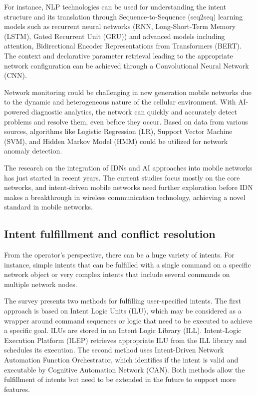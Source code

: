For instance, NLP technologies can be used for understanding the intent structure and its translation through Sequence-to-Sequence (seq2seq) learning models such as recurrent neural networks (RNN, Long-Short-Term Memory (LSTM), Gated Recurrent Unit (GRU)) and advanced models including attention, Bidirectional Encoder Representations from Transformers (BERT). The context and declarative parameter retrieval leading to the appropriate network configuration can be achieved through a Convolutional Neural Network (CNN).\cite{Mehmood2021}

Network monitoring could be challenging in new generation mobile networks due to the dynamic and heterogeneous nature of the cellular environment. With AI-powered diagnostic analytics, the network can quickly and accurately detect problems and resolve them, even before they occur. Based on data from various sources, algorithms like Logistic Regression (LR), Support Vector Machine (SVM), and Hidden Markov Model (HMM) could be utilized for network anomaly detection.\cite{anuradha2017empowering}

The research on the integration of IDNs and AI approaches into mobile networks has just started in recent years. The current studies focus mostly on the core networks, and intent-driven mobile networks need further exploration before IDN makes a breakthrough in wireless communication technology, achieving a novel standard in mobile networks.

\subsection{Intent fulfillment and conflict resolution}

From the operator’s perspective, there can be a huge variety of intents. For instance, simple intents that can be fulfilled with a single command on a specific network object or very complex intents that include several commands on multiple network nodes.

The survey \cite{Mwanje2021} presents two methods for fulfilling user-specified intents. The first approach is based on Intent Logic Units (ILU), which may be considered as a wrapper around command sequences or logic that need to be executed to achieve a specific goal. ILUs are stored in an Intent Logic Library (ILL). Intent-Logic Execution Platform (ILEP) retrieves appropriate ILU from the ILL library and schedules its execution. The second method uses Intent-Driven Network Automation Function Orchestrator, which identifies if the intent is valid and executable by Cognitive Automation Network (CAN). Both methods allow the fulfillment of intents but need to be extended in the future to support more features.

